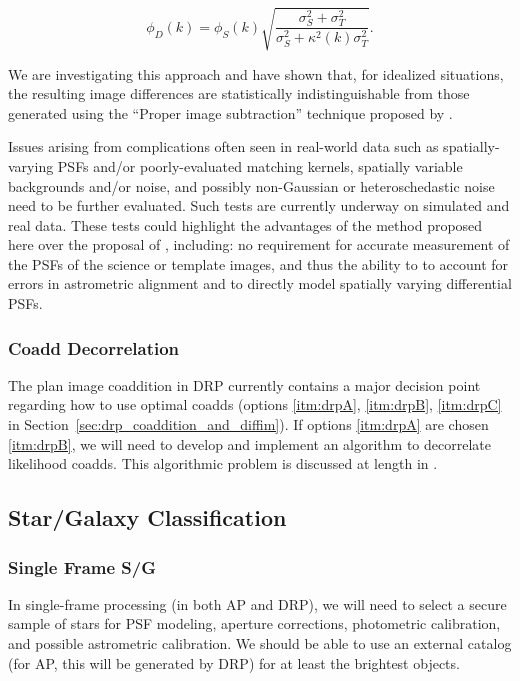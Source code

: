 \begin{equation}
  \phi_D(k) = \phi_S(k) \sqrt{\frac{\sigma_S^2+\sigma_T^2}{\sigma_S^2 + \kappa^2(k)\sigma_T^2}}.
\end{equation}

We are investigating this approach and have shown that, for idealized situations, the resulting image differences are statistically indistinguishable from those generated using the ``Proper image subtraction'' technique proposed by \cite{2016ApJ...830...27Z}.

Issues arising from complications often seen in real-world data such as spatially-varying PSFs and/or poorly-evaluated matching kernels, spatially variable backgrounds and/or noise, and possibly non-Gaussian or heteroschedastic noise need to be further evaluated. Such tests are currently underway on simulated and real data. These tests could highlight the advantages of the method proposed here over the proposal of \cite{2016ApJ...830...27Z}, including: no requirement for accurate measurement of the PSFs of the science or template images, and thus the ability to to account for errors in astrometric alignment and to directly model spatially varying differential PSFs.

\subsubsection{Coadd Decorrelation}
\label{sec:acCoaddDecorrelation}

The plan image coaddition in DRP currently contains a major decision point regarding how to use optimal coadds (options \ref{itm:drpA}, \ref{itm:drpB}, \ref{itm:drpC} in Section~\ref{sec:drp_coaddition_and_diffim}).  If options \ref{itm:drpA} are chosen \ref{itm:drpB}, we will need to develop and implement an algorithm to decorrelate likelihood coadds.  This algorithmic problem is discussed at length in .

\subsection{Star/Galaxy Classification}
\label{sec:acClassification}

\subsubsection{Single Frame S/G}
\label{sec:acSingleFrameClassification}

In single-frame processing (in both AP and DRP), we will need to select a secure sample of stars for PSF modeling, aperture corrections, photometric calibration, and possible astrometric calibration.  We should be able to use an external catalog (for AP, this will be generated by DRP) for at least the brightest objects.

